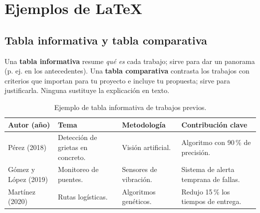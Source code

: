 
\section{Ejemplos de LaTeX} \label{sec:ejemplos}

\subsection{Tabla informativa y tabla comparativa}

Una \textbf{tabla informativa} resume \emph{qué es} cada trabajo; sirve para dar un panorama (p. ej. en los
antecedentes). Una \textbf{tabla comparativa} contrasta los trabajos con criterios que importan para tu proyecto e
incluye tu propuesta; sirve para justificarla. Ninguna sustituye la explicación en texto.

\begin{table}[H]
  \centering
  \caption{Ejemplo de tabla informativa de trabajos previos.}
  \label{tab:ejemplo_informativa}
  \begin{tabular}{@{}p{2.6cm}p{3cm}p{3.6cm}p{5cm}@{}}
    \toprule
    \textbf{Autor (año)} & \textbf{Tema} & \textbf{Metodología} & \textbf{Contribución clave} \\
    \midrule
    Pérez (2018)        & Detección de grietas en concreto. & Visión artificial. & Algoritmo con 90\,\% de precisión. \\
    Gómez y López (2019) & Monitoreo de puentes.            & Sensores de vibración. & Sistema de alerta temprana de fallas. \\
    Martínez (2020)      & Rutas logísticas.                & Algoritmos genéticos.  & Redujo 15\,\% los tiempos de entrega. \\
    \bottomrule
  \end{tabular}
\end{table}

